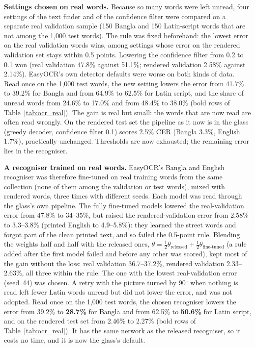 \textbf{Settings chosen on real words.} Because so many words were left unread, four settings of the text finder and of the confidence filter were compared on a separate real validation sample (150 Bangla and 150 Latin-script words that are not among the 1,000 test words). The rule was fixed beforehand: the lowest error on the real validation words wins, among settings whose error on the rendered validation set stays within 0.5 points. Lowering the confidence filter from 0.2 to 0.1 won (real validation 47.8\% against 51.1\%; rendered validation 2.58\% against 2.14\%). EasyOCR's own detector defaults were worse on both kinds of data. Read once on the 1,000 test words, the new setting lowers the error from 41.7\% to 39.2\% for Bangla and from 64.9\% to 62.5\% for Latin script, and the share of unread words from 24.6\% to 17.0\% and from 48.4\% to 38.0\% (bold rows of Table~\ref{tab:ocr_real}). The gain is real but small: the words that are now read are often read wrongly. On the rendered test set the pipeline as it now is in the glass (greedy decoder, confidence filter 0.1) scores 2.5\% CER (Bangla 3.3\%, English 1.7\%), practically unchanged. Thresholds are now exhausted; the remaining error lies in the recogniser.

\textbf{A recogniser trained on real words.} EasyOCR's Bangla and English recogniser was therefore fine-tuned on real training words from the same collection (none of them among the validation or test words), mixed with rendered words, three times with different seeds. Each model was read through the glass's own pipeline. The fully fine-tuned models lowered the real-validation error from 47.8\% to 34--35\%, but raised the rendered-validation error from 2.58\% to 3.3--3.8\% (printed English to 4.9--5.8\%): they learned the street words and forgot part of the clean printed text, and so failed the 0.5-point rule. Blending the weights half and half with the released ones, $\theta = \tfrac12\theta_{\text{released}} + \tfrac12\theta_{\text{fine-tuned}}$ (a rule added after the first model failed and before any other was scored), kept most of the gain without the loss: real validation 36.7--37.2\%, rendered validation 2.33--2.63\%, all three within the rule. The one with the lowest real-validation error (seed~44) was chosen. A retry with the picture turned by 90$^\circ$ when nothing is read left fewer Latin words unread but did not lower the error, and was not adopted. Read once on the 1,000 test words, the chosen recogniser lowers the error from 39.2\% to \textbf{28.7\%} for Bangla and from 62.5\% to \textbf{50.6\%} for Latin script, and on the rendered test set from 2.46\% to 2.27\% (bold rows of Table~\ref{tab:ocr_real}). It has the same network as the released recogniser, so it costs no time, and it is now the glass's default.

